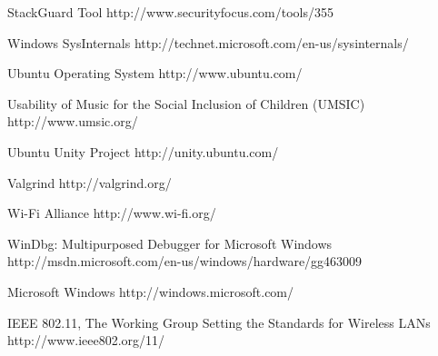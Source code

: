 \begin{thebibliography}{9}
		{StackGuard Tool}
		{http://www.securityfocus.com/tools/355}

		{Windows SysInternals}
		{http://technet.microsoft.com/en-us/sysinternals/}

		{Ubuntu Operating System}
		{http://www.ubuntu.com/}

		{Usability of Music for the Social Inclusion of Children (UMSIC)}
		{http://www.umsic.org/}
		
		{Ubuntu Unity Project}
		{http://unity.ubuntu.com/}

		{Valgrind}
		{http://valgrind.org/}

		{Wi-Fi Alliance}
		{http://www.wi-fi.org/}

		{WinDbg: Multipurposed Debugger for Microsoft Windows}
		{http://msdn.microsoft.com/en-us/windows/hardware/gg463009}

		{Microsoft Windows}
		{http://windows.microsoft.com/}

		{IEEE 802.11, The Working Group Setting the Standards for Wireless LANs}
		{http://www.ieee802.org/11/}

\end{thebibliography}